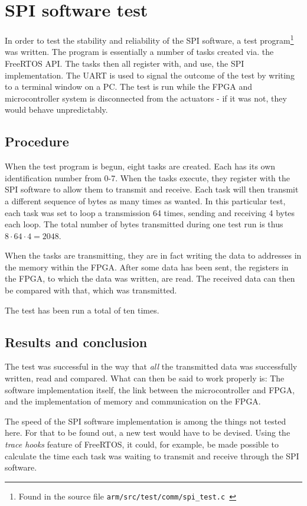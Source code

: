 \chapter{SPI software test}\label{sec:armspitest}
In order to test the stability and reliability of the SPI software, a test program\footnote{Found in the source file \texttt{arm/src/test/comm/spi\_test.c
}} was written. The program is essentially a number of tasks created via. the FreeRTOS API. The tasks then all register with, and use, the SPI implementation. The UART is used to signal the outcome of the test by writing to a terminal window on a PC. The test is run while the FPGA and microcontroller system is disconnected from the actuators - if it was not, they would behave unpredictably.


\section{Procedure}
When the test program is begun, eight tasks are created. Each has its own identification number from 0-7. When the tasks execute, they register with the SPI software to allow them to transmit and receive. Each task will then transmit a different sequence of bytes as many times as wanted. In this particular test, each task was set to loop a transmission 64 times, sending and receiving 4 bytes each loop. The total number of bytes transmitted during one test run is thus $8 \cdot 64 \cdot 4 = 2048$.

When the tasks are transmitting, they are in fact writing the data to addresses in the memory within the FPGA. After some data has been sent, the registers in the FPGA, to which the data was written, are read. The received data can then be compared with that, which was transmitted.

The test has been run a total of ten times.

\section{Results and conclusion}
The test was successful in the way that \textit{all} the transmitted data was successfully written, read and compared. What can then be said to work properly is: The software implementation itself, the link between the microcontroller and FPGA, and the implementation of memory and communication on the FPGA. 

The speed of the SPI software implementation is among the things not tested here. For that to be found out, a new test would have to be devised. Using the \textit{trace hooks} feature of FreeRTOS, it could, for example, be made possible to calculate the time each task was waiting to transmit and receive through the SPI software.


